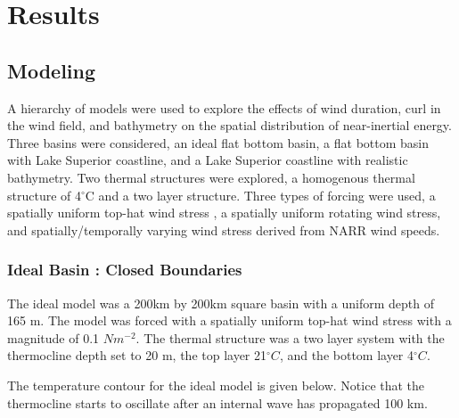 \chapter{Results}
\label{current_results_chapter}

\section{Modeling}
A hierarchy of models were used to explore the effects of wind duration, curl in the wind field, and bathymetry on 
the spatial distribution of near-inertial energy. Three basins were considered, an ideal flat bottom basin, a flat bottom basin with 
Lake Superior coastline, and a Lake Superior coastline with realistic bathymetry. Two thermal structures were explored, a homogenous
thermal structure of 4$^{\circ}$C and a two layer structure. Three types of forcing were used, a spatially uniform top-hat wind stress , 
a spatially uniform rotating wind stress,  and spatially/temporally varying wind stress derived from NARR wind speeds. 


\subsection{Ideal Basin : Closed Boundaries}
The ideal model was a 200km by 200km square basin with a uniform depth of 165 m. The model was forced with a spatially
uniform top-hat wind stress with a magnitude of 0.1 $N m^{-2}$. The thermal structure was a two layer system with the thermocline depth 
set to 20 m, the top layer 21$^{\circ}C$, and the bottom layer 4$^{\circ}C$. 


The temperature contour for the ideal model is given below. Notice that the thermocline starts to oscillate after an internal wave has 
propagated 100 km. 



